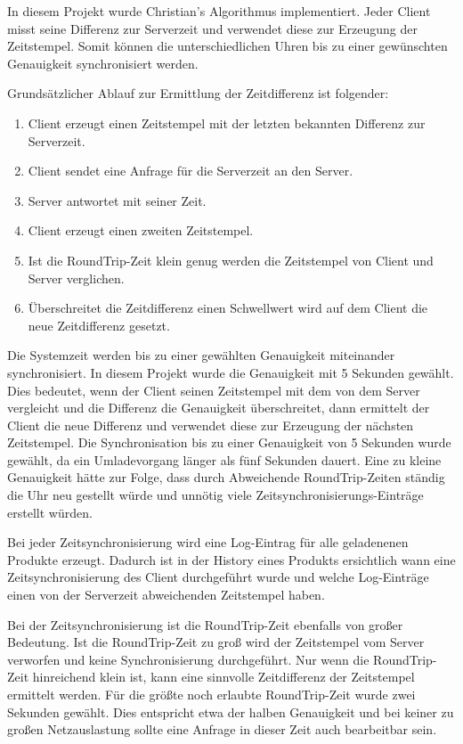 In diesem Projekt wurde Christian's Algorithmus implementiert. Jeder Client misst seine
	Differenz zur Serverzeit und verwendet diese zur Erzeugung der Zeitstempel. Somit
	können die unterschiedlichen Uhren bis zu einer gewünschten Genauigkeit
	synchronisiert werden.

Grundsätzlicher Ablauf zur Ermittlung der Zeitdifferenz ist folgender:

\begin{enumerate}
	\item Client erzeugt einen Zeitstempel mit der letzten bekannten
		Differenz zur Serverzeit.
	\item Client sendet eine Anfrage für die Serverzeit an den Server.
	\item Server antwortet mit seiner Zeit.
	\item Client erzeugt einen zweiten Zeitstempel.
	\item Ist die RoundTrip-Zeit klein genug werden die Zeitstempel
		von Client und Server verglichen.
	\item Überschreitet die Zeitdifferenz einen Schwellwert wird auf
		dem Client die neue Zeitdifferenz gesetzt.
\end{enumerate}

Die Systemzeit werden bis zu einer gewählten Genauigkeit miteinander synchronisiert.
	In diesem Projekt wurde die Genauigkeit mit 5 Sekunden gewählt. Dies bedeutet,
	wenn der Client seinen Zeitstempel mit dem von dem Server vergleicht und die
	Differenz die Genauigkeit überschreitet, dann ermittelt der Client die neue
	Differenz und verwendet diese zur Erzeugung der nächsten Zeitstempel. Die
	Synchronisation bis zu einer Genauigkeit von 5 Sekunden wurde gewählt, da ein
	Umladevorgang länger als fünf Sekunden dauert. Eine zu kleine Genauigkeit
	hätte zur Folge, dass durch Abweichende RoundTrip-Zeiten ständig die Uhr neu
	gestellt würde und unnötig viele Zeitsynchronisierungs-Einträge erstellt würden.
	
Bei jeder Zeitsynchronisierung wird eine Log-Eintrag für alle geladenenen Produkte erzeugt.
	Dadurch ist in der History eines Produkts ersichtlich wann eine Zeitsynchronisierung
	des Client durchgeführt wurde und welche Log-Einträge einen von der Serverzeit
	abweichenden Zeitstempel haben.

Bei der Zeitsynchronisierung ist die RoundTrip-Zeit ebenfalls von großer Bedeutung.
	Ist die RoundTrip-Zeit zu groß wird der Zeitstempel vom Server verworfen und keine
	Synchronisierung durchgeführt. Nur wenn die RoundTrip-Zeit hinreichend klein ist,
	kann eine sinnvolle Zeitdifferenz der Zeitstempel ermittelt werden. Für die größte
	noch erlaubte RoundTrip-Zeit wurde zwei Sekunden gewählt. Dies entspricht etwa
	der halben Genauigkeit und bei keiner zu großen Netzauslastung sollte eine Anfrage
	in dieser Zeit auch bearbeitbar sein.


